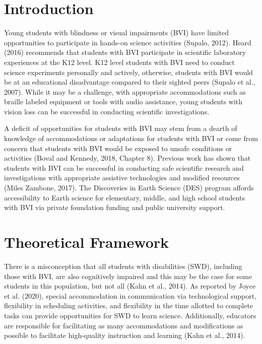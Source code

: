 \documentclass[11.5pt]{sig-alternate}
\begin{document}
\pagebreak
\pagebreak

\vspace{5mm}
\section*{\vspace{140mm}}
\begin{large}
\section*{Introduction}
Young students with blindness or visual impairments (BVI) have limited opportunities to participate in hands-on science activities (Supalo, 2012). Heard (2016) recommends that students with BVI participate in scientific laboratory experiences at the K12 level. K12 level students with BVI need to conduct science experiments personally and actively, otherwise, students with BVI would be at an educational disadvantage compared to their sighted peers (Supalo et al., 2007). While it may be a challenge, with appropriate accommodations such as braille labeled equipment or tools with audio assistance, young students with vision loss can be successful in conducting scientific investigations. 

A deficit of opportunities for students with BVI may stem from a dearth of knowledge of accommodations or adaptations for students with BVI or come from concern that students with BVI would be exposed to unsafe conditions or activities (Boval and Kennedy, 2018, Chapter 8). Previous work has shown that students with BVI can be successful in conducting safe scientific research and investigations with appropriate assistive technologies and modified resources (Miles Zambone, 2017). The Discoveries in Earth Science (DES) program affords accessibility to Earth science for elementary, middle, and high school students with BVI via private foundation funding and public university support.

\section*{Theoretical Framework}

There is a misconception that all students with disabilities (SWD), including those with BVI, are also cognitively impaired and this may be the case for some students in this population, but not all (Kahn et al., 2014). As reported by Joyce et al. (2020), special accommodation in communication via technological support, flexibility in scheduling activities, and flexibility in the time allotted to complete tasks can provide opportunities for SWD to learn science. Additionally, educators are responsible for facilitating as many accommodations and modifications as possible to facilitate high-quality instruction and learning (Kahn et al., 2014).


\end{large}
\end{document}
